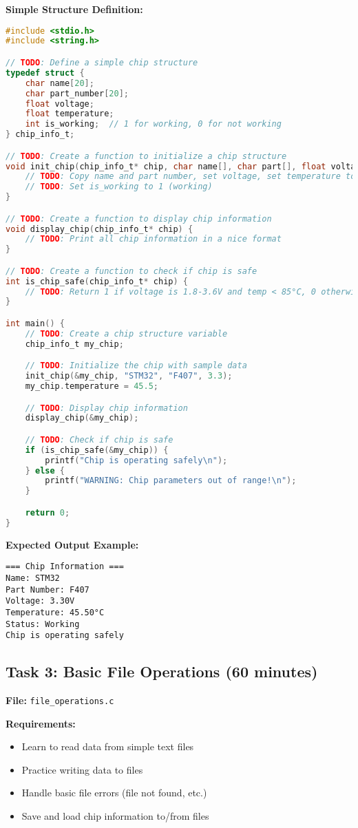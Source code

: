 \documentclass[11pt,a4paper]{article}
\begin{document}
\textbf{Simple Structure Definition:}
\begin{lstlisting}[language=C]
#include <stdio.h>
#include <string.h>

// TODO: Define a simple chip structure
typedef struct {
    char name[20];
    char part_number[20];
    float voltage;
    float temperature;
    int is_working;  // 1 for working, 0 for not working
} chip_info_t;

// TODO: Create a function to initialize a chip structure
void init_chip(chip_info_t* chip, char name[], char part[], float voltage) {
    // TODO: Copy name and part number, set voltage, set temperature to 0
    // TODO: Set is_working to 1 (working)
}

// TODO: Create a function to display chip information
void display_chip(chip_info_t* chip) {
    // TODO: Print all chip information in a nice format
}

// TODO: Create a function to check if chip is safe
int is_chip_safe(chip_info_t* chip) {
    // TODO: Return 1 if voltage is 1.8-3.6V and temp < 85°C, 0 otherwise
}

int main() {
    // TODO: Create a chip structure variable
    chip_info_t my_chip;

    // TODO: Initialize the chip with sample data
    init_chip(&my_chip, "STM32", "F407", 3.3);
    my_chip.temperature = 45.5;

    // TODO: Display chip information
    display_chip(&my_chip);

    // TODO: Check if chip is safe
    if (is_chip_safe(&my_chip)) {
        printf("Chip is operating safely\n");
    } else {
        printf("WARNING: Chip parameters out of range!\n");
    }

    return 0;
}
\end{lstlisting}

\textbf{Expected Output Example:}
\begin{verbatim}
=== Chip Information ===
Name: STM32
Part Number: F407
Voltage: 3.30V
Temperature: 45.50°C
Status: Working
Chip is operating safely
\end{verbatim}

\subsection{Task 3: Basic File Operations (60 minutes)}

\textbf{File:} \texttt{file\_operations.c}

\textbf{Requirements:}
\begin{itemize}
    \item Learn to read data from simple text files
    \item Practice writing data to files
    \item Handle basic file errors (file not found, etc.)
    \item Save and load chip information to/from files
\end{itemize}
\end{document}
